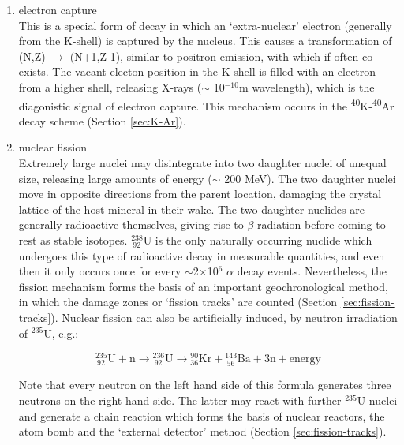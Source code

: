 \documentclass{book}
\begin{document}
\begin{enumerate}
\item{electron capture}\\ This is a special form of decay in which an
  `extra-nuclear' electron (generally from the K-shell) is captured by
  the nucleus. This causes a transformation of (N,Z) $\rightarrow$
  (N+1,Z-1), similar to positron emission, with which if often
  co-exists. The vacant electon position in the K-shell is filled with
  an electron from a higher shell, releasing X-rays ($\sim$
  10$^{-10}$m wavelength), which is the diagonistic signal of electron
  capture. This mechanism occurs in the
  \textsuperscript{40}K-\textsuperscript{40}Ar decay scheme (Section
  \ref{sec:K-Ar}).

\item{nuclear fission}\\ Extremely large nuclei may disintegrate into
  two daughter nuclei of unequal size, releasing large amounts of
  energy ($\sim$ 200 MeV). The two daughter nuclei move in opposite
  directions from the parent location, damaging the crystal lattice of
  the host mineral in their wake. The two daughter nuclides are
  generally radioactive themselves, giving rise to $\beta$ radiation
  before coming to rest as stable isotopes.  $^{238}_{~92}$U is the
  only naturally occurring nuclide which undergoes this type of
  radioactive decay in measurable quantities, and even then it only
  occurs once for every $\sim$2$\times$10$^6$ $\alpha$ decay events.
  Nevertheless, the fission mechanism forms the basis of an important
  geochronological method, in which the damage zones or `fission
  tracks' are counted (Section \ref{sec:fission-tracks}). Nuclear
  fission can also be artificially induced, by neutron irradiation of
  $^{235}$U, e.g.:

\begin{equation}
{}^{235}_{~92}\mathrm{U} + \mathrm{n} \rightarrow
{}^{236}_{~92}\mathrm{U} \rightarrow {}^{90}_{36}\mathrm{Kr} +
{}^{143}_{~56}\mathrm{Ba} + 3\mathrm{n} + \mbox{energy}
\label{eq:235Ufission}
\end{equation}

Note that every neutron on the left hand side of this formula
generates three neutrons on the right hand side. The latter may react
with further $^{235}$U nuclei and generate a chain reaction which
forms the basis of nuclear reactors, the atom bomb and the `external
detector' method (Section \ref{sec:fission-tracks}).

\end{enumerate}
\end{document}
